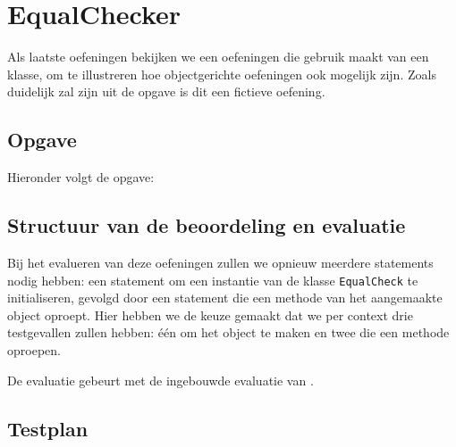 \inputminted{json}{sources/isbn-plan.tson}

\section{EqualChecker}\label{sec:oefening-equal}

Als laatste oefeningen bekijken we een oefeningen die gebruik maakt van een klasse, om te illustreren hoe objectgerichte oefeningen ook mogelijk zijn.
Zoals duidelijk zal zijn uit de opgave is dit een fictieve oefening.

\subsection{Opgave}\label{subsec:oefeningen-equal-opgave}

Hieronder volgt de opgave:

\begin{quote}
\end{quote}

\subsection{Structuur van de beoordeling en evaluatie}\label{subsec:oefening-equal-structuur}

Bij het evalueren van deze oefeningen zullen we opnieuw meerdere statements nodig hebben: een statement om een instantie van de klasse \texttt{EqualCheck} te initialiseren, gevolgd door een statement die een methode van het aangemaakte object oproept.
Hier hebben we de keuze gemaakt dat we per context drie testgevallen zullen hebben: één om het object te maken en twee die een methode oproepen.

De evaluatie gebeurt met de ingebouwde evaluatie van \tested{}.

\subsection{Testplan}\label{subsec:oefening-equal-testplan}


